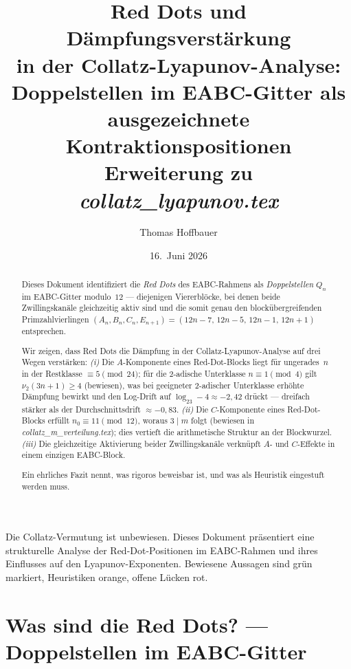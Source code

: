 \documentclass[12pt,a4paper]{article}
\title{%
  Red Dots und Dämpfungsverstärkung\\[0.3em]
  in der Collatz-Lyapunov-Analyse:\\[0.3em]
  Doppelstellen im EABC-Gitter als ausgezeichnete\\
  Kontraktionspositionen\\[0.5em]
  \large Erweiterung zu \textit{collatz\_lyapunov.tex}%
}
\author{Thomas Hoffbauer}
\date{16.\ Juni 2026}
\newcommand{\vii}{\nu_2}
\newcommand{\logt}{\log_2}
\begin{document}
\maketitle

\begin{abstract}
Dieses Dokument identifiziert die \emph{Red Dots} des EABC-Rahmens als
\emph{Doppelstellen} $Q_n$ im EABC-Gitter modulo~$12$ ---
diejenigen Viererblöcke, bei denen beide Zwillingskanäle gleichzeitig aktiv
sind und die somit genau den blockübergreifenden Primzahlvierlingen
$(A_n, B_n, C_n, E_{n+1}) = (12n{-}7,\,12n{-}5,\,12n{-}1,\,12n{+}1)$
entsprechen.

Wir zeigen, dass Red Dots die Dämpfung in der Collatz-Lyapunov-Analyse auf
drei Wegen verstärken:
\emph{(i)} Die $A$-Komponente eines Red-Dot-Blocks liegt für ungerades~$n$
in der Restklasse $\equiv 5\pmod{24}$; für die 2-adische Unterklasse
$n \equiv 1\pmod{4}$ gilt $\vii(3n+1) \geq 4$ (bewiesen), was
bei geeigneter 2-adischer Unterklasse erhöhte Dämpfung bewirkt und den
Log-Drift auf $\logt 3 - 4 \approx -2{,}42$ drückt --- dreifach stärker als
der Durchschnittsdrift $\approx -0{,}83$.
\emph{(ii)} Die $C$-Komponente eines Red-Dot-Blocks erfüllt
$n_0 \equiv 11\pmod{12}$, woraus $3 \mid m$ folgt
(bewiesen in \textit{collatz\_m\_verteilung.tex}); dies vertieft die
arithmetische Struktur an der Blockwurzel.
\emph{(iii)} Die gleichzeitige Aktivierung beider Zwillingskanäle verknüpft
$A$- und $C$-Effekte in einem einzigen EABC-Block.

Ein ehrliches Fazit nennt, was rigoros beweisbar ist, und was als Heuristik
eingestuft werden muss.
\end{abstract}

\tableofcontents
\bigskip

\begin{tcolorbox}[warnung, title={Einordnung}]
Die Collatz-Vermutung ist unbewiesen. Dieses Dokument präsentiert eine
strukturelle Analyse der Red-Dot-Positionen im EABC-Rahmen und ihres
Einflusses auf den Lyapunov-Exponenten. Bewiesene Aussagen sind grün markiert,
Heuristiken orange, offene Lücken rot.
\end{tcolorbox}

\section{Was sind die Red Dots? --- Doppelstellen im EABC-Gitter}
\label{sec:red_dots}
\end{document}
